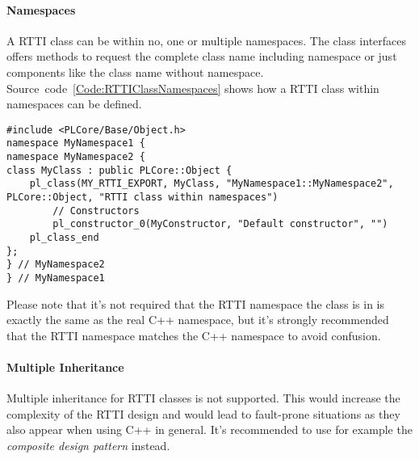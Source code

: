 \paragraph{Namespaces}
A \ac{RTTI} class can be within no, one or multiple namespaces. The class interfaces offers methods to request the complete class name including namespace or just components like the class name without namespace. Source~code~\ref{Code:RTTIClassNamespaces} shows how a \ac{RTTI} class within namespaces can be defined.
\begin{lstlisting}[float=htb,label=Code:RTTIClassNamespaces,caption={Using namespaces within the \ac{RTTI}}]
#include <PLCore/Base/Object.h>
namespace MyNamespace1 {
namespace MyNamespace2 {
class MyClass : public PLCore::Object {
	pl_class(MY_RTTI_EXPORT, MyClass, "MyNamespace1::MyNamespace2", PLCore::Object, "RTTI class within namespaces")
		// Constructors
		pl_constructor_0(MyConstructor, "Default constructor", "")
	pl_class_end
};
} // MyNamespace2
} // MyNamespace1
\end{lstlisting}
Please note that it's not required that the \ac{RTTI} namespace the class is in is exactly the same as the real C++ namespace, but it's strongly recommended that the \ac{RTTI} namespace matches the C++ namespace to avoid confusion.


\paragraph{Multiple Inheritance}
Multiple inheritance for \ac{RTTI} classes is not supported. This would increase the complexity of the \ac{RTTI} design and would lead to fault-prone situations as they also appear when using C++ in general. It's recommended to use for example the \emph{composite design pattern} instead.



